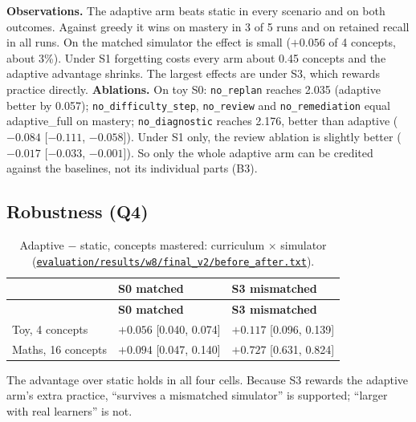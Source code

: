 \documentclass[english]{sintr}
\newcommand{\repourl}{https://github.com/Bhuvan-56/adaptive-learning-path-planner-DAT}
\newcommand{\sha}{cs5903-final-2026}
\DeclareRobustCommand{\rf}[1]{\href{\repourl/blob/\sha/#1}{\nolinkurl{#1}}}
\begin{document}
\textbf{Observations.} The adaptive arm beats static in every scenario and on both outcomes. Against greedy it wins on mastery in 3 of 5 runs and on retained recall in all runs. On the matched simulator the effect is small ($+0.056$ of 4 concepts, about 3\%). Under S1 forgetting costs every arm about 0.45 concepts and the adaptive advantage shrinks. The largest effects are under S3, which rewards practice directly.
\vspace{0.2em}\newline
\textbf{Ablations.} On toy S0: \texttt{no\_replan} reaches 2.035 (adaptive better by 0.057); \texttt{no\_difficulty\_step}, \texttt{no\_review} and \texttt{no\_remediation} equal adaptive\_full on mastery; \texttt{no\_diagnostic} reaches 2.176, better than adaptive ($-0.084$ [$-0.111$, $-0.058$]). Under S1 only, the review ablation is slightly better ($-0.017$ [$-0.033$, $-0.001$]). So only the whole adaptive arm can be credited against the baselines, not its individual parts (B3).

\subsection{Robustness (Q4)}
{\small
\begin{longtable}{|L{4.35cm}|C{5.34cm}|C{5.34cm}|}
\caption{Adaptive $-$ static, concepts mastered: curriculum $\times$ simulator (\rf{evaluation/results/w8/final_v2/before_after.txt}).}\\
\hline
 & \textbf{S0 matched} & \textbf{S3 mismatched} \\ \hline
\endfirsthead
\hline & \textbf{S0 matched} & \textbf{S3 mismatched} \\ \hline
\endhead
Toy, 4 concepts & $+0.056$ [0.040, 0.074] & $+0.117$ [0.096, 0.139] \\ \hline
Maths, 16 concepts & $+0.094$ [0.047, 0.140] & $+0.727$ [0.631, 0.824] \\ \hline
\end{longtable}
}
The advantage over static holds in all four cells. Because S3 rewards the adaptive arm's extra practice, ``survives a mismatched simulator'' is supported; ``larger with real learners'' is not.
\end{document}
